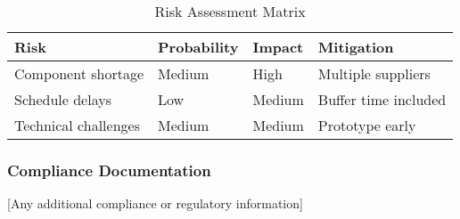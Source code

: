 \documentclass[final]{designreport}
\begin{document}
\begin{table}[htbp]
\centering
\caption{Risk Assessment Matrix}
\begin{tabular}{@{}llll@{}}
\toprule
Risk & Probability & Impact & Mitigation \\
\midrule
Component shortage & Medium & High & Multiple suppliers \\
Schedule delays & Low & Medium & Buffer time included \\
Technical challenges & Medium & Medium & Prototype early \\
\bottomrule
\end{tabular}
\end{table}

\subsubsection{Compliance Documentation}
[Any additional compliance or regulatory information]
\end{document}
